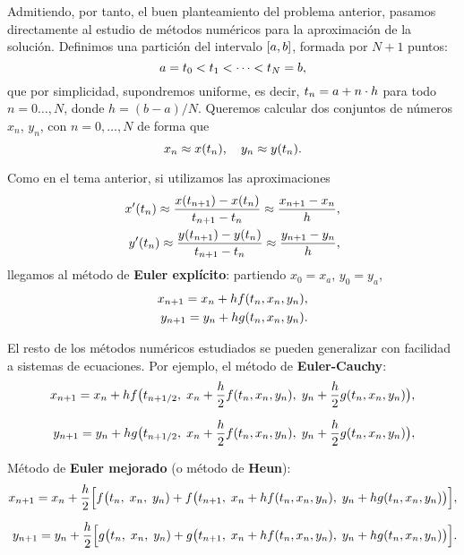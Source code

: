 Admitiendo, por tanto, el buen planteamiento del problema anterior,
pasamos directamente al estudio de métodos numéricos para la
aproximación de la solución.
Definimos una partición del intervalo $[a,b]$, formada por
$N+1$ puntos:
\begin{equation*}
  a=t_0 < t_1 < \cdots < t_N=b,
\end{equation*}
que por simplicidad, supondremos uniforme, es decir,
$t_n=a+n\cdot h$ para todo $n=0\dots,N$, donde $h=(b-a)/N$.
Queremos calcular dos conjuntos de números $x_n$, $y_n$, con
$n=0,\dots,N$ de forma que
$$
x_n \approx x({t_n}), \quad y_n \approx y({t_n}).
$$

Como en el tema anterior, si utilizamos las aproximaciones
\begin{align*}
  x'({t_n})\approx \frac{x({t_{n+1}})-x({t_n})}{t_{n+1}-t_n} \approx \frac{x_{n+1}-x_n}h,
  \\
  y'({t_n})\approx \frac{y({t_{n+1}})-y({t_n})}{t_{n+1}-t_n} \approx \frac{y_{n+1}-y_n}h,
\end{align*}
llegamos al método de \textbf{Euler explícito}: partiendo $x_0=x_a$, $y_0=y_a$,
\begin{align*}
  x_{n+1} = x_n + h f({t_n},x_n,y_n),
  \\
  y_{n+1} = y_n + h g({t_n},x_n,y_n).
\end{align*}

El resto de los métodos numéricos estudiados se pueden generalizar con facilidad a sistemas de ecuaciones. Por ejemplo, el método de \textbf{Euler-Cauchy}:
\begin{align*}
  x_{n+1} = x_n + h
  f\big(t_{n+1/2},\; x_n+\frac h2 f(\tn,x_n,y_n),\; y_n+\frac h2 g(\tn,x_n,y_n) \big),
  \\\noalign{\medskip}
  y_{n+1} = y_n + h
  g\big(t_{n+1/2},\; x_n+\frac h2 f(\tn,x_n,y_n),\; y_n+\frac h2 g(\tn,x_n,y_n) \big),
\end{align*}

Método de \textbf{Euler mejorado} (o método de \textbf{Heun}):
\begin{align*}
  x_{n+1} = x_n + \frac h2
  \Big[ f\big(t_{n},\; x_n,\; y_n)+
  f\big(t_{n+1},\; x_n+ h f(\tn,x_n,y_n),\; y_n+ h g(\tn,x_n,y_n) \big)
  \Big],
  \\\noalign{\medskip}
  y_{n+1} = y_n + \frac h2
  \Big[ g\big(t_{n},\; x_n,\; y_n)+
  g\big(t_{n+1},\; x_n+ h f(\tn,x_n,y_n),\; y_n+ h g(\tn,x_n,y_n) \big)
  \Big].
\end{align*}

